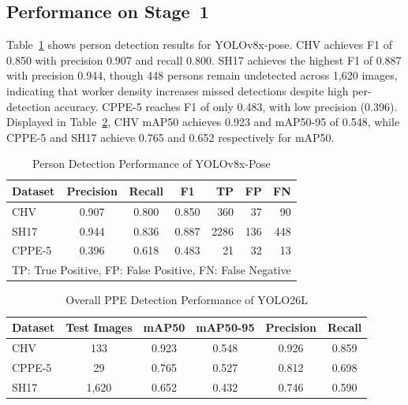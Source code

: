 \documentclass[conference,a4paper]{IEEEtran}
\begin{document}
\subsection{Performance on Stage~1}
Table~\ref{tab:l1a} shows person detection results for YOLOv8x-pose. CHV achieves F1 of 0.850 with precision 0.907 and recall 0.800. SH17 achieves the highest F1 of 0.887 with precision 0.944, though 448 persons remain undetected across 1,620 images, indicating that worker density increases missed detections despite high per-detection accuracy. CPPE-5 reaches F1 of only 0.483, with low precision (0.396). Displayed in Table~\ref{tab:l1b}, CHV mAP50 achieves 0.923 and mAP50-95 of 0.548, while CPPE-5 and SH17 achieve 0.765 and 0.652 respectively for mAP50.

\begin{table}[!htbp]
    \centering
    \caption{Person Detection Performance of YOLOv8x-Pose}
    \label{tab:l1a}
    \begin{tabular}{lcccrrr}
        \hline
        \textbf{Dataset}&
        \textbf{Precision} & \textbf{Recall} & \textbf{F1} &
        \textbf{TP} & \textbf{FP} & \textbf{FN} \\
        \hline
        CHV    & 0.907 & 0.800 & 0.850 & 360 & 37  & 90  \\
        SH17   & 0.944 & 0.836 & 0.887 & 2286 & 136 & 448 \\
        CPPE-5 & 0.396 & 0.618 & 0.483 & 21  & 32  & 13  \\
        \hline
        \multicolumn{7}{l}{\footnotesize TP: True Positive, FP: False Positive, FN: False Negative}
    \end{tabular}
\end{table}

\begin{table}[!htbp]
    \centering
    \caption{Overall PPE Detection Performance of YOLO26L}
    \label{tab:l1b}
    \begin{tabular}{lccccc}
        \hline
        \textbf{Dataset} &
        \textbf{Test Images} &
        \textbf{mAP50} & \textbf{mAP50-95} &
        \textbf{Precision} & \textbf{Recall} \\
        \hline
        CHV    & 133   & 0.923 & 0.548 & 0.926 & 0.859 \\
        CPPE-5 & 29    & 0.765 & 0.527 & 0.812 & 0.698 \\
        SH17   & 1,620 & 0.652 & 0.432 & 0.746 & 0.590 \\
        \hline
    \end{tabular}
\end{table}
\end{document}
